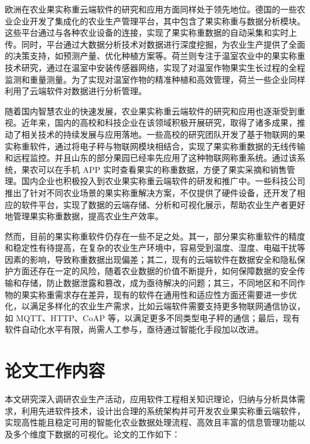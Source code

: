 欧洲在农业果实称重云端软件的研究和应用方面同样处于领先地位。德国的一些农业企业开发了集成化的农业生产管理平台，其中包含了果实称重与数据分析模块\cite{Yin2020}。这些平台通过与各种农业设备的连接，实现了果实称重数据的自动采集和实时上传。同时，平台通过大数据分析技术对数据进行深度挖掘，为农业生产提供了全面的决策支持，如预测产量、优化种植方案等\cite{Phate2021}。荷兰则专注于温室农业中的果实称重技术研究，通过在温室中安装传感器网络，实现了对温室作物果实生长过程的全程监测和重量测量\cite{Graaf2004}。为了实现对温室作物的精准种植和高效管理，荷兰一些企业同样利用了云端软件对数据进行分析管理。

随着国内智慧农业的快速发展，农业果实称重云端软件的研究和应用也逐渐受到重视。近年来，国内的高校和科技企业在该领域积极开展研究，取得了诸多成果，推动了相关技术的持续发展与应用落地。一些高校的研究团队开发了基于物联网的果实称重软件，通过将电子秤与物联网模块相结合，实现了果实称重数据的无线传输和远程监控\cite{Zhu2013}。并且山东的部分果园已经率先应用了这种物联网称重系统。通过该系统，果农可以在手机 APP 实时查看果实的称重数据，方便了果实采摘和销售管理\cite{Gao2023}。国内企业也积极投入到农业果实称重云端软件的研发和推广中。一些科技公司推出了针对不同农业场景的果实称重解决方案\cite{Ningbo2019}，不仅提供了硬件设备，还开发了相应的软件平台，实现了数据的云端存储、分析和可视化展示，帮助农业生产者更好地管理果实称重数据，提高农业生产效率。

然而，目前的果实称重软件仍存在一些不足之处。其一，部分果实称重软件的精度和稳定性有待提高，在复杂的农业生产环境中，容易受到温度、湿度、电磁干扰等因素的影响，导致称重数据出现偏差\cite{汤建华2018}；其二，现有的云端软件在数据安全和隐私保护方面还存在一定的风险，随着农业数据的价值不断提升，如何保障数据的安全传输和存储，防止数据泄露和篡改，成为亟待解决的问题；其三，不同地区和不同作物的果实称重需求存在差异，现有的软件在通用性和适应性方面还需要进一步优化，以满足多样化的农业生产需求，比如云端软件需要支持更多物联网通信协议，如 MQTT、HTTP、CoAP 等，以满足更多不同类型电子秤的通信；最后，现有软件自动化水平有限，尚需人工参与，亟待通过智能化手段加以改进。

\section{论文工作内容}

本文研究深入调研农业生产活动，应用软件工程相关知识理论，归纳与分析具体需求，利用先进软件技术，设计出合理的系统架构并可开发农业果实称重云端软件，实现高性能且稳定可用的智能化农业数据处理流程、高效且丰富的信息管理功能以及多个维度下数据的可视化。论文的工作如下：

